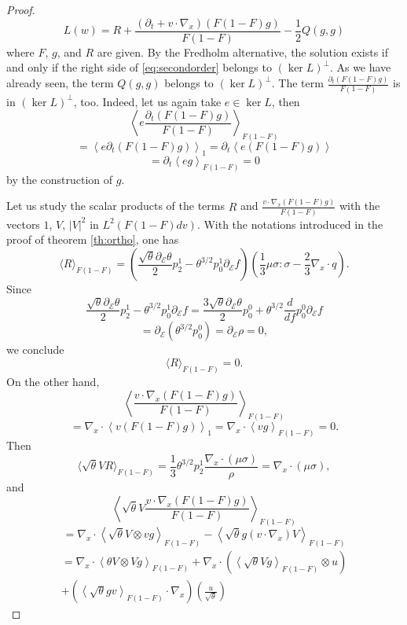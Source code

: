 \begin{proof}
\begin{equation}\label{eq:secondorder}
L(w)=R+\frac{(\partial_t+v\cdot\nabla_x)(F(1-F)g)}{F(1-F)}-\frac{1}{2}Q(g,g)\end{equation}where $F$, $g$, and $R$ are given. By the Fredholm alternative, the solution exists if and only if the right side of \eqref{eq:secondorder} belongs to $(\ker L)^\bot$.
As we have already seen, the term $Q(g,g)$ belongs to $(\ker L)^\bot$. The term $\frac{\partial_t(F(1-F)g)}{F(1-F)}$ is in $(\ker L)^\bot$, too. Indeed, let us again take $  e\in \ker L$, then
\[ \left\langle   e \frac{\partial_t(F(1-F)g)}{F(1-F)}\right\rangle_{F(1-F)}\]
\[= \left\langle   e  \partial_t(F(1-F)g)  \right\rangle_{1}=  
\partial_t\left\langle   e  (F(1-F)g)  \right\rangle \]
\[=   
\partial_t\left\langle   e  g  \right\rangle_{F(1-F)}=0\]
by the construction of $g$. 

Let us study the scalar products of the terms $R$ and $\frac{  v\cdot\nabla_x 
(F(1-F)g)}{F(1-F)}$ with the vectors $1$, $V$, $|V|^2$ in $L^2(F(1-F)dv)$. With the notations introduced in the proof of theorem \ref{th:ortho}, one has
\[\langle R\rangle_{F(1-F)}=\left(\frac{\sqrt \theta\partial_{\mathcal
E}\theta}{2}p^1_2-\theta^{3/2}p^1_0\partial_{\mathcal E}f\right)\left(\frac {1}{3} \mu\sigma:\sigma-\frac
23 \nabla_x\cdot q\right).\]
Since
\[\frac{\sqrt \theta\partial_{\mathcal
E}\theta}{2}p^1_2-\theta^{3/2}p^1_0\partial_{\mathcal E}f=
\frac{3\sqrt \theta\partial_{\mathcal
E}\theta}{2}p^0_0+\theta^{3/2}\frac{d}{df}p^0_0\partial_{\mathcal E}f
\]
\[=\partial_{\mathcal 
E}(\theta^{3/2}p^0_0)=\partial_{\mathcal
E}\rho =0
,\]
we conclude \[\langle R\rangle_{F(1-F)}=0.\]
On the other hand,
\[\left\langle \frac{  v\cdot\nabla_x (F(1-F)g)}{F(1-F)}  
\right\rangle_{F(1-F)}\]
\[=\nabla_x \cdot\left\langle    v(F(1-F)g)  \right\rangle_{1}=
\nabla_x \cdot\left\langle    v g \right\rangle_{F(1-F)}=0.\]
Then
\[\langle \sqrt\theta V R\rangle_{F(1-F)}=\frac 13 \theta^{3/2} p^1_2  \frac{ \nabla_x\cdot (\mu\sigma)}{\rho}=
  \nabla_x\cdot (\mu\sigma) ,\]
and
\[\left\langle  \sqrt\theta V\frac{  v\cdot\nabla_x (F(1-F)g)}{F(1-F)}  
\right\rangle_{F(1-F)}\]
\[=\nabla_x\cdot\left\langle  \sqrt\theta V\otimes v  g \right\rangle_{F(1-F)}-
\left\langle  \sqrt\theta g ( v\cdot\nabla_x)V   \right\rangle_{F(1-F)}\]
\[\begin{split}=\nabla_x\cdot\left\langle  \theta V\otimes V  g 
\right\rangle_{F(1-F)}+
\nabla_x\cdot\left(\left\langle   \sqrt\theta V  g \right\rangle_{F(1-F)}
  \otimes u\right)
\\+\left(\left\langle \sqrt\theta g   v    
\right\rangle_{F(1-F)}\cdot\nabla_x\right)\left(\frac{u}{\sqrt\theta} 
\right)\end{split}\]


\end{proof}
